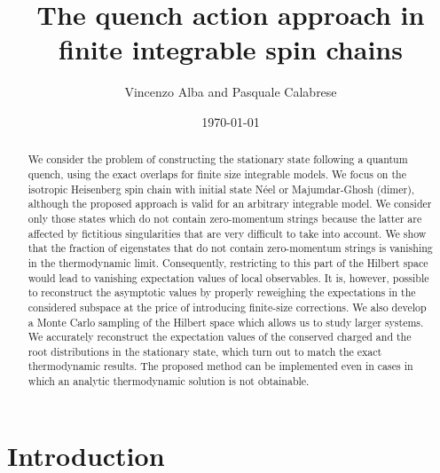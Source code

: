 \documentclass[11pt]{iopart}
\begin{document}
\setlength{\parindent}{0pt}


\title{The quench action approach in finite integrable spin chains}


\author{Vincenzo Alba and Pasquale Calabrese }
%
\address{$^1$\,SISSA and INFN, via Bonomea 265, 34136 Trieste, Italy. }




\date{\today}



\begin{abstract} 

We consider the problem of constructing the stationary state following a quantum quench, 
using the exact overlaps for finite size integrable models. 
We focus on the isotropic Heisenberg spin chain with initial state N\'eel or Majumdar-Ghosh (dimer),
although the proposed approach is valid for an arbitrary integrable model. 
We consider only those states which do not contain zero-momentum strings because the latter 
are affected by fictitious singularities that are very difficult to take into account. 
We show that the fraction of eigenstates that do not contain zero-momentum strings is vanishing in the thermodynamic limit.
Consequently, restricting to this part of the Hilbert space would lead to vanishing expectation values of local observables. 
It is, however, possible to reconstruct the asymptotic values by properly reweighing the expectations in the considered 
subspace at the price of introducing finite-size corrections. 
We also develop a Monte Carlo sampling of the Hilbert space which allows us to study larger systems. 
We accurately reconstruct the expectation values of the conserved charged and the root distributions in the stationary state, 
which turn out to match the exact thermodynamic results. 
The proposed method can be  implemented even in cases in which an analytic thermodynamic solution is not obtainable.

\end{abstract}

\maketitle

\section{Introduction}
\label{intro}
\end{document}
